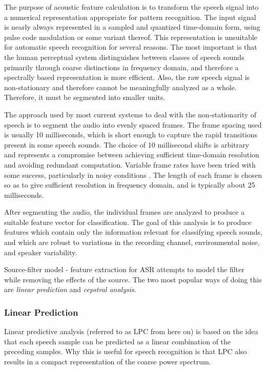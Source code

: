 \documentclass{article}
\begin{document}
The purpose of acoustic feature calculation is to transform the speech
signal into a numerical representation appropriate for pattern
recognition.  The input signal is nearly always represented in a
sampled and quantized time-domain form, using pulse code modulation or
some variant thereof.  This representation is unsuitable for automatic
speech recognition for several reasons.  The most important is that
the human perceptual system distinguishes between classes of speech
sounds primarily through coarse distinctions in frequency domain, and
therefore a spectrally based representation is more efficient.  Also,
the raw speech signal is non-stationary and therefore cannot be
meaningfully analyzed as a whole.  Therefore, it must be segmented
into smaller units.

The approach used by most current systems to deal with the
non-stationarity of speech is to segment the audio into evenly spaced
frames.  The frame spacing used is usually 10 milliseconds, which is
short enough to capture the rapid transitions present in some speech
sounds.  The choice of 10 millisecond shifts is arbitrary and
represents a compromise between achieving sufficient time-domain
resolution and avoiding redundant computation.  Variable frame rates
have been tried with some success, particularly in noisy conditions
\cite{zhu2000}.  The length of each frame is chosen so as to give
sufficient resolution in frequency domain, and is typically about 25
milliseconds.

After segmenting the audio, the individual frames are analyzed to
produce a suitable feature vector for classification.  The goal of
this analysis is to produce features which contain only the
information relevant for classifying speech sounds, and which are
robust to variations in the recording channel, environmental noise,
and speaker variability.

Source-filter model - feature extraction for ASR attempts to model the
filter while removing the effects of the source.  The two most popular
ways of doing this are {\em linear prediction} and {\em cepstral
  analysis}.

\subsubsection{Linear Prediction}
\label{sec:lpc}

Linear predictive analysis (referred to as LPC from here on) is based
on the idea that each speech sample can be predicted as a linear
combination of the preceding samples.  Why this is useful for speech
recognition is that LPC also results in a compact representation of
the coarse power spectrum.
\end{document}
